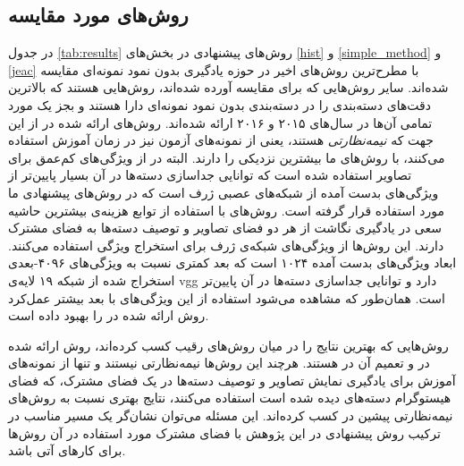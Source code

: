 \subsection{روش‌های مورد مقایسه}\label{exp:other_methods}
 در جدول 
  \ref{tab:results}
 روش‌های پیشنهادی در بخش‌های \ref{hist} و  \ref{simple_method} و \ref{jeac}   با مطرح‌ترین روش‌های اخیر در حوزه یادگیری بدون نمود نمونه‌ای مقایسه شده‌اند.
سایر روش‌هایی که برای مقایسه آورده شده‌اند، روش‌هایی هستند که بالاترین دقت‌های دسته‌بندی را در دسته‌بندی بدون نمود نمونه‌ای دارا هستند و بجز یک مورد تمامی آن‌ها در سال‌های ۲۰۱۵ و ۲۰۱۶ ارائه شده‌اند.
روش‌های ارائه شده در
\cite{li15max, semi15, Kodirov2015}
از این جهت که \textit{نیمه‌نظارتی} هستند، یعنی از  نمونه‌های آزمون نیز در زمان آموزش استفاده می‌کنند، با روش‌های ما بیشترین نزدیکی را دارند. البته در
\cite{li15max, semi15}
از ویژگی‌های کم‌عمق برای تصاویر استفاده شده است که توانایی جداسازی دسته‌ها در آن بسیار پایین‌تر از ویژگی‌های بدست آمده از شبکه‌های عصبی ژرف است که در روش‌های پیشنهادی ما مورد استفاده قرار گرفته است. روش‌های
\cite{Akata2015, Xian2016}
با استفاده از توابع هزینه‌ی بیشترین حاشیه سعی در یادگیری نگاشت از هر دو فضای تصاویر و توصیف دسته‌ها به فضای مشترک دارند. این روش‌ها از ویژگی‌های شبکه‌ی ژرف
 \cite{googlenet}
 برای استخراج ویژگی استفاده می‌کنند. ابعاد ویژگی‌های بدست آمده ۱۰۲۴ است که بعد کمتری نسبت به ویژگی‌های ۴۰۹۶-بعدی استخراج شده از شبکه ۱۹ لایه‌ی vgg دارد و توانایی جداسازی دسته‌ها در آن پایین‌تر است. همان‌طور که مشاهده می‌شود استفاده از این ویژگی‌های با بعد بیشتر عمل‌کرد روش ارائه شده در \cite{Akata2015} را بهبود داده است.

 روش‌هایی که بهترین نتایج را در میان روش‌های رقیب کسب کرده‌اند، روش ارائه شده در \cite{sse} و تعمیم آن در \cite{agnostic}  هستند. هرچند این روش‌ها نیمه‌نظارتی نیستند و تنها از نمونه‌های آموزش برای یادگیری نمایش تصاویر و توصیف دسته‌ها در یک فضای مشترک، که فضای هیستوگرام دسته‌های دیده شده است استفاده می‌کنند، نتایج بهتری نسبت به روش‌های نیمه‌نظارتی پیشین در \cite{li15max, semi15, Kodirov2015} کسب کرده‌اند. این مسئله می‌توان نشان‌گر یک مسیر مناسب در ترکیب روش پیشنهادی در این پژوهش با فضای مشترک مورد استفاده در آن روش‌ها برای کارهای آتی باشد.

